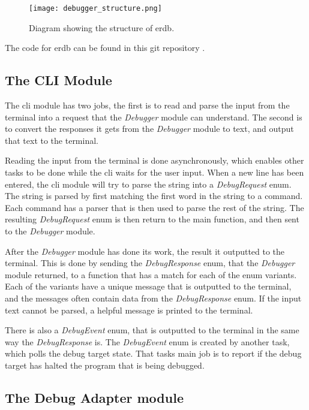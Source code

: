\begin{figure}[h]
	\centering
	\texttt{[image: debugger\_structure.png]}
	\caption{Diagram showing the structure of \gls{erdb}.}
	\label{fig:ERDStruct}
\end{figure}


The code for \gls{erdb} can be found in this git repository \cite{erdb}.


\subsection{The CLI Module} 
The \acrshort{cli} module has two jobs, the first is to read and parse the input from the terminal into a request that the \emph{Debugger} module can understand.
The second is to convert the responses it gets from the \emph{Debugger} module to text, and output that text to the terminal.


Reading the input from the terminal is done asynchronously, which enables other tasks to be done while the \acrshort{cli} waits for the user input.
When a new line has been entered, the \acrshort{cli} module will try to parse the string into a \emph{DebugRequest} enum.
The string is parsed by first matching the first word in the string to a command.
Each command has a parser that is then used to parse the rest of the string.
The resulting \emph{DebugRequest} enum is then return to the main function, and then sent to the \emph{Debugger} module.



After the \emph{Debugger} module has done its work, the result it outputted to the terminal.
This is done by sending the \emph{DebugResponse} enum, that the \emph{Debugger} module returned, to a function that has a match for each of the enum variants.
Each of the variants have a unique message that is outputted to the terminal, and the messages often contain data from the \emph{DebugResponse} enum.
If the input text cannot be parsed, a helpful message is printed to the terminal.



There is also a \emph{DebugEvent} enum, that is outputted to the terminal in the same way the \emph{DebugResponse} is.
The \emph{DebugEvent} enum is created by another task, which polls the debug target state.
That tasks main job is to report if the debug target has halted the program that is being debugged.



\subsection{The Debug Adapter module}


